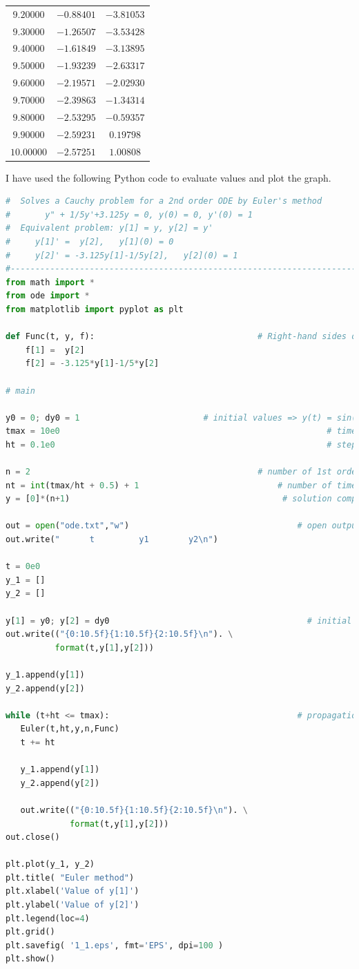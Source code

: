 \documentclass[a4paper,10pt]{article}
\begin{document}
\begin{center}
\begin{longtable}{ |c|c|c| }
$   9.20000  $ & $-0.88401$ & $ -3.81053$\\
$   9.30000  $ & $-1.26507 $ & $ -3.53428$\\
$   9.40000  $ & $-1.61849 $ & $ -3.13895$\\
$   9.50000 $ & $ -1.93239 $ & $ -2.63317$\\
$   9.60000 $ & $ -2.19571 $ & $ -2.02930$\\
$   9.70000 $ & $ -2.39863 $ & $ -1.34314$\\
$   9.80000 $ & $ -2.53295 $ & $ -0.59357$\\
$   9.90000 $ & $ -2.59231$ & $   0.19798$\\
$  10.00000  $ & $-2.57251 $ & $  1.00808$\\
 \hline
\end{longtable}
\end{center}
I have used the following Python code \cite{inp} to evaluate values and plot the graph.
\begin{lstlisting}[language=Python]
#  Solves a Cauchy problem for a 2nd order ODE by Euler's method
#		y" + 1/5y'+3.125y = 0, y(0) = 0, y'(0) = 1
#  Equivalent problem: y[1] = y, y[2] = y'
#     y[1]' =  y[2],   y[1](0) = 0
#     y[2]' = -3.125y[1]-1/5y[2],   y[2](0) = 1
#----------------------------------------------------------------------------
from math import *
from ode import *
from matplotlib import pyplot as plt

def Func(t, y, f):                                 # Right-hand sides of ODEs
	f[1] =  y[2]
	f[2] = -3.125*y[1]-1/5*y[2]

# main

y0 = 0; dy0 = 1                         # initial values => y(t) = sin(t)
tmax = 10e0                                                      # time span
ht = 0.1e0                                                       # step size

n = 2                                              # number of 1st order ODEs
nt = int(tmax/ht + 0.5) + 1                            # number of time steps
y = [0]*(n+1)                                           # solution components

out = open("ode.txt","w")                                  # open output file
out.write("      t         y1        y2\n")

t = 0e0
y_1 = []
y_2 = []

y[1] = y0; y[2] = dy0                                        # initial values
out.write(("{0:10.5f}{1:10.5f}{2:10.5f}\n"). \
          format(t,y[1],y[2]))

y_1.append(y[1])
y_2.append(y[2])

while (t+ht <= tmax):                                      # propagation loop
   Euler(t,ht,y,n,Func)
   t += ht
	
   y_1.append(y[1])
   y_2.append(y[2])

   out.write(("{0:10.5f}{1:10.5f}{2:10.5f}\n"). \
             format(t,y[1],y[2]))
out.close()

plt.plot(y_1, y_2)
plt.title( "Euler method")
plt.xlabel('Value of y[1]') 
plt.ylabel('Value of y[2]')
plt.legend(loc=4)
plt.grid()
plt.savefig( '1_1.eps', fmt='EPS', dpi=100 )
plt.show()
\end{lstlisting}
\end{document}
